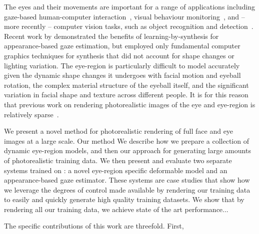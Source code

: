 The eyes and their movements are important for a range of applications including gaze-based human-computer interaction~\cite{majaranta14_apc}, visual behaviour monitoring~\cite{bulling13_chi,bulling11_pami}, and -- more recently -- computer vision tasks, such as object recognition and detection~\cite{yun2013studying,papadopoulos2014training,karthikeyan2013and}.
Recent work by \citet{sugano2014learning} demonstrated the benefits of learning-by-synthesis for appearance-based gaze estimation, but employed only fundamental computer graphics techniques for synthesis that did not account for shape changes or lighting variation.
The eye-region is particularly difficult to model accurately given the dynamic shape changes it undergoes with facial motion and eyeball rotation, the complex material structure of the eyeball itself, and the significant variation in facial shape and texture across different people.
It is for this reason that previous work on rendering photorealistic images of the eye and eye-region is relatively sparse~\cite{ActiBlizEyes,berard2014highquality}.





We present a novel method for photorealistic rendering of full face and eye images at a large scale.
Our method 
We describe how we prepare a collection of dynamic eye-region models, and then our approach for generating large amounts of photorealistic training data.
We then present and evaluate two separate systems trained on \dataset: a novel eye-region specific deformable model and an appearance-based gaze estimator.
These systems are case studies that show how we leverage the degrees of control made available by rendering our training data to easily and quickly generate high quality training datasets.
We show that by rendering all our training data, we achieve state of the art performance...

The specific contributions of this work are threefold. First, 

